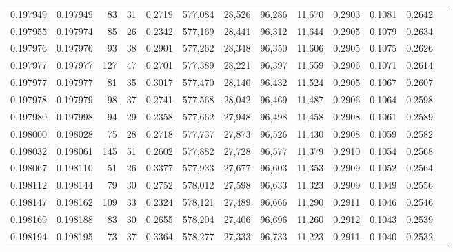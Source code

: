 \begin{tabular}{rrrrrrrrrrrrr}
0.197949 & 0.197949 &    83 &  31 &                                     0.2719 & 577,084 &  28,526 &  96,286 &  11,670 & 0.2903 & 0.1081 & 0.2642 \\
0.197955 & 0.197974 &    85 &  26 &                                     0.2342 & 577,169 &  28,441 &  96,312 &  11,644 & 0.2905 & 0.1079 & 0.2634 \\
0.197976 & 0.197976 &    93 &  38 &                                     0.2901 & 577,262 &  28,348 &  96,350 &  11,606 & 0.2905 & 0.1075 & 0.2626 \\
0.197977 & 0.197977 &   127 &  47 &                                     0.2701 & 577,389 &  28,221 &  96,397 &  11,559 & 0.2906 & 0.1071 & 0.2614 \\
0.197977 & 0.197977 &    81 &  35 &                                     0.3017 & 577,470 &  28,140 &  96,432 &  11,524 & 0.2905 & 0.1067 & 0.2607 \\
0.197978 & 0.197979 &    98 &  37 &                                     0.2741 & 577,568 &  28,042 &  96,469 &  11,487 & 0.2906 & 0.1064 & 0.2598 \\
0.197980 & 0.197998 &    94 &  29 &                                     0.2358 & 577,662 &  27,948 &  96,498 &  11,458 & 0.2908 & 0.1061 & 0.2589 \\
0.198000 & 0.198028 &    75 &  28 &                                     0.2718 & 577,737 &  27,873 &  96,526 &  11,430 & 0.2908 & 0.1059 & 0.2582 \\
0.198032 & 0.198061 &   145 &  51 &                                     0.2602 & 577,882 &  27,728 &  96,577 &  11,379 & 0.2910 & 0.1054 & 0.2568 \\
0.198067 & 0.198110 &    51 &  26 &                                     0.3377 & 577,933 &  27,677 &  96,603 &  11,353 & 0.2909 & 0.1052 & 0.2564 \\
0.198112 & 0.198144 &    79 &  30 &                                     0.2752 & 578,012 &  27,598 &  96,633 &  11,323 & 0.2909 & 0.1049 & 0.2556 \\
0.198147 & 0.198162 &   109 &  33 &                                     0.2324 & 578,121 &  27,489 &  96,666 &  11,290 & 0.2911 & 0.1046 & 0.2546 \\
0.198169 & 0.198188 &    83 &  30 &                                     0.2655 & 578,204 &  27,406 &  96,696 &  11,260 & 0.2912 & 0.1043 & 0.2539 \\
0.198194 & 0.198195 &    73 &  37 &                                     0.3364 & 578,277 &  27,333 &  96,733 &  11,223 & 0.2911 & 0.1040 & 0.2532 \\

\end{tabular}
